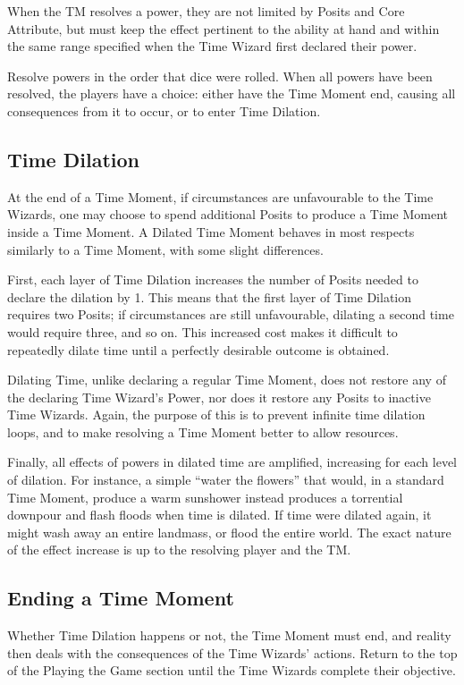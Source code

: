 \documentclass{article}
\begin{document}
When the TM resolves a power, they are not limited by Posits and Core Attribute, but must keep
the effect pertinent to the ability at hand and within the same range specified when the Time
Wizard first declared their power.

Resolve powers in the order that dice were rolled. When all powers have been resolved, the
players have a choice: either have the Time Moment end, causing all consequences from it to
occur, or to enter Time Dilation.

\subsection{Time Dilation} \label{ssec:time-dilation}
At the end of a Time Moment, if circumstances are unfavourable to the Time Wizards, one may
choose to spend additional Posits to produce a Time Moment inside a Time Moment. A Dilated Time
Moment behaves in most respects similarly to a Time Moment, with some slight differences.

First, each layer of Time Dilation increases the number of Posits needed to declare the dilation
by 1. This means that the first layer of Time Dilation requires two Posits; if circumstances are
still unfavourable, dilating a second time would require three, and so on. This increased cost
makes it difficult to repeatedly dilate time until a perfectly desirable outcome is obtained.

Dilating Time, unlike declaring a regular Time Moment, does not restore any of the declaring
Time Wizard's Power, nor does it restore any Posits to inactive Time Wizards. Again, the purpose
of this is to prevent infinite time dilation loops, and to make resolving a Time Moment better
to allow resources.

Finally, all effects of powers in dilated time are amplified, increasing for each level of
dilation. For instance, a simple ``water the flowers'' that would, in a standard Time Moment,
produce a warm sunshower instead produces a torrential downpour and flash floods when time is
dilated. If time were dilated again, it might wash away an entire landmass, or flood the entire
world. The exact nature of the effect increase is up to the resolving player and the TM.

\subsection{Ending a Time Moment} \label{ssec:end-moment}
Whether Time Dilation happens or not, the Time Moment must end, and reality then deals with the
consequences of the Time Wizards' actions. Return to the top of the Playing the Game section
until the Time Wizards complete their objective.
\end{document}
